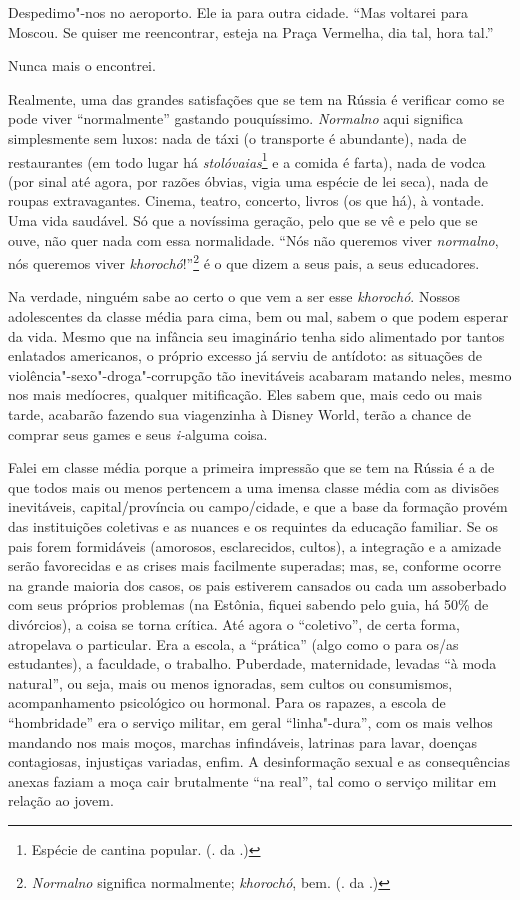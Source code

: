 Despedimo"-nos no aeroporto. Ele ia para outra cidade. ``Mas voltarei para Moscou. Se quiser me reencontrar, esteja na Praça Vermelha, dia tal, hora tal.''

Nunca mais o encontrei.

Realmente, uma das grandes satisfações que se tem na Rússia é verificar como se pode viver ``normalmente'' gastando pouquíssimo. \emph{Normalno} aqui significa simplesmente sem luxos: nada de táxi (o transporte é abundante), nada de restaurantes (em todo lugar há \emph{stolóvaias}\footnote{Espécie de cantina popular. (. da .)} e a comida é farta), nada de vodca (por sinal até agora, por razões óbvias, vigia uma espécie de lei seca), nada de roupas extravagantes. Cinema, teatro, concerto, livros (os que há), à vontade. Uma vida saudável. Só que a novíssima geração, pelo que se vê e pelo que se ouve, não quer nada com essa normalidade. ``Nós não queremos viver \emph{normalno}, nós queremos viver \emph{khorochó}!''\footnote{\emph{Normalno} significa normalmente; \emph{khorochó}, bem. (. da .)} é o que dizem a seus pais, a seus educadores.

Na verdade, ninguém sabe ao certo o que vem a ser esse \emph{khorochó}. Nossos adolescentes da classe média para cima, bem ou mal, sabem o que podem esperar da vida. Mesmo que na infância seu imaginário tenha sido alimentado por tantos enlatados americanos, o próprio excesso já serviu de antídoto: as situações de violência"-sexo"-droga"-corrupção tão inevitáveis acabaram matando neles, mesmo nos mais medíocres, qualquer mitificação. Eles sabem que, mais cedo ou mais tarde, acabarão fazendo sua viagenzinha à Disney World, terão a chance de comprar seus games e seus \emph{i-}alguma coisa.

Falei em classe média porque a primeira impressão que se tem na Rússia é a de que todos mais ou menos pertencem a uma imensa classe média com as divisões inevitáveis, capital/província ou campo/cidade, e que a base da formação provém das instituições coletivas e as nuances e os requintes da educação familiar. Se os pais forem formidáveis (amorosos, esclarecidos, cultos), a integração e a amizade serão favorecidas e as crises mais facilmente superadas; mas, se, conforme ocorre na grande maioria dos casos, os pais estiverem cansados ou cada um assoberbado com seus próprios problemas (na Estônia, fiquei sabendo pelo guia, há 50\% de divórcios), a coisa se torna crítica. Até agora o ``coletivo'', de certa forma, atropelava o particular. Era a escola, a ``prática'' (algo como o  para os/as estudantes), a faculdade, o trabalho. Puberdade, maternidade, levadas ``à moda natural'', ou seja, mais ou menos ignoradas, sem cultos ou consumismos, acompanhamento psicológico ou hormonal. Para os rapazes, a escola de ``hombridade'' era o serviço militar, em geral ``linha"-dura'', com os mais velhos mandando nos mais moços, marchas infindáveis, latrinas para lavar, doenças contagiosas, injustiças variadas, enfim. A desinformação sexual e as consequências anexas faziam a moça cair brutalmente ``na real'', tal como o serviço militar em relação ao jovem.

